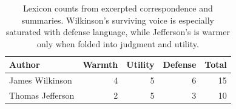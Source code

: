 \begin{table}[t]
\centering
\small
\begin{tabular}{lrrrr}
\toprule
Author & Warmth & Utility & Defense & Total \\
\midrule
James Wilkinson & 4 & 5 & 6 & 15 \\
Thomas Jefferson & 2 & 5 & 3 & 10 \\
\bottomrule
\end{tabular}
\caption{Lexicon counts from excerpted correspondence and summaries. Wilkinson's surviving voice is especially saturated with defense language, while Jefferson's is warmer only when folded into judgment and utility.}
\label{tab:themes}
\end{table}
